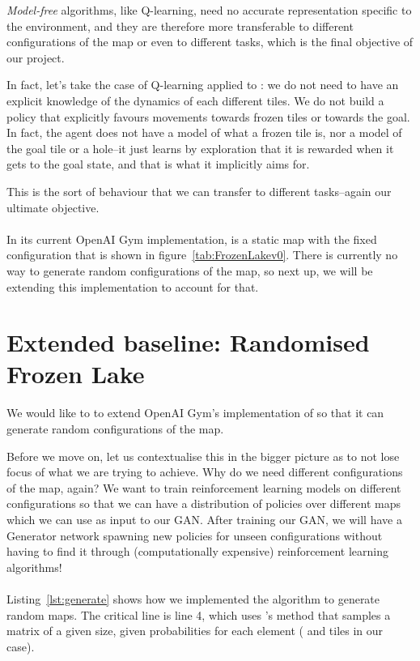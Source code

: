 \emph{Model-free} algorithms, like Q-learning, need no accurate representation specific to the environment, and they are therefore more transferable to different configurations of the map or even to different tasks, which is the final objective of our project.

In fact, let's take the case of Q-learning applied to : we do not need to have an explicit knowledge of the dynamics of each different tiles. We do not build a policy that explicitly favours movements towards frozen tiles or towards the goal. In fact, the agent does not have a model of what a frozen tile is, nor a model of the goal tile or a hole--it just learns by exploration that it is rewarded when it gets to the goal state, and that is what it implicitly aims for.

This is the sort of behaviour that we can transfer to different tasks--again our ultimate objective.
\\\\
In its current OpenAI Gym implementation,  is a static map with the fixed configuration that is shown in figure~\ref{tab:FrozenLakev0}. There is currently no way to generate random configurations of the map, so next up, we will be extending this implementation to account for that.

\section{Extended baseline: Randomised Frozen Lake}
\label{ExtendedBaseline}
We would like to to extend OpenAI Gym's implementation of  so that it can generate random configurations of the map.

Before we move on, let us contextualise this in the bigger picture as to not lose focus of what we are trying to achieve. Why do we need different configurations of the map, again? We want to train reinforcement learning models on different configurations so that we can have a distribution of policies over different maps which we can use as input to our GAN. After training our GAN, we will have a Generator network spawning new policies for unseen configurations without having to find it through (computationally expensive) reinforcement learning algorithms!
\\\\
Listing~\ref{lst:generate} shows how we implemented the algorithm to generate random maps. The critical line is line 4, which uses 's  method that samples a matrix of a given size, given probabilities for each element ( and  tiles in our case).

